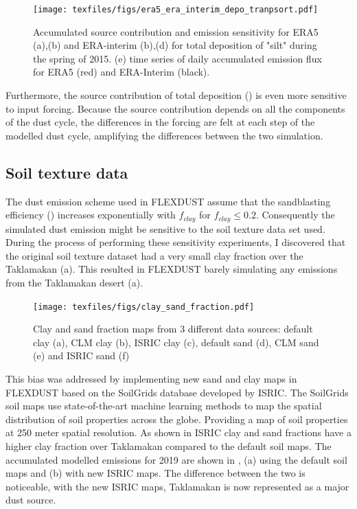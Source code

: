 \begin{figure}[htbp]
    \centering
    \texttt{[image: texfiles/figs/era5\_era\_interim\_depo\_tranpsort.pdf]}
    \caption{Accumulated source contribution and emission sensitivity for ERA5 (a),(b) and ERA-interim (b),(d) for total deposition of "silt" during the spring of 2015. (e) time series of daily accumulated emission flux for ERA5 (red) and ERA-Interim (black).}
    \label{fig:era5_era_interim_source}
\end{figure}

Furthermore, the source contribution of total deposition () is even more sensitive to input forcing. 
Because the source contribution depends on all the components of the dust cycle, the differences in the forcing are felt at each step of the modelled dust cycle, amplifying the differences between the two simulation.

\subsection{Soil texture data}\label{sec:sens_soil}
The dust emission scheme used in FLEXDUST assume that the sandblasting efficiency () increases exponentially with $f_{clay}$ for $f_{clay} \leq 0.2$. Consequently the simulated dust emission might be sensitive to the soil texture data set used.
During the process of performing these sensitivity experiments, I discovered that the original soil texture dataset had a very small clay fraction over the Taklamakan (a). This resulted in FLEXDUST barely simulating any emissions from the Taklamakan desert (a).

\begin{figure}[hptb]
    \centering
    \texttt{[image: texfiles/figs/clay\_sand\_fraction.pdf]}
    \caption{Clay and sand fraction maps from 3 different data sources: default clay (a), CLM clay (b), ISRIC clay (c), default sand (d), CLM sand (e) and ISRIC sand (f)}
    \label{fig:clay_sand_fraction_comparison}
\end{figure}

This bias was addressed by implementing new sand and clay maps in FLEXDUST based on the SoilGrids database developed by ISRIC.  The SoilGrids soil maps use state-of-the-art machine learning methods to map the spatial distribution of soil properties across the globe.
Providing a map of soil properties at 250 meter spatial resolution. 
As shown in  ISRIC clay and sand fractions have a higher clay fraction over Taklamakan compared to the default soil maps. 
The accumulated modelled emissions for 2019 are shown in , (a) using the default soil maps and (b) with new ISRIC maps. 
The difference between the two is noticeable, with the new ISRIC maps, Taklamakan is now represented as a major dust source.

